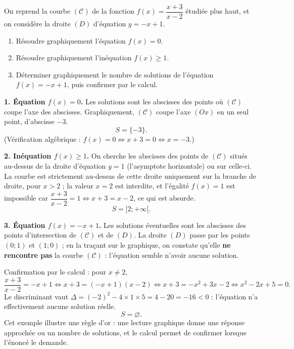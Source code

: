 \documentclass[11pt]{article}
\begin{document}
\begin{exoresolu}
On reprend la courbe $(\mathcal{C})$ de la fonction $f(x)=\dfrac{x+3}{x-2}$ étudiée plus haut, et on considère la droite $(D)$ d'équation $y=-x+1$.
\begin{enumerate}
\item Résoudre graphiquement l'équation $f(x)=0$.
\item Résoudre graphiquement l'inéquation $f(x)\geq 1$.
\item Déterminer graphiquement le nombre de solutions de l'équation $f(x)=-x+1$, puis confirmer par le calcul.
\end{enumerate}
\tcblower
\textbf{1. Équation $f(x)=0$.} Les solutions sont les abscisses des points où $(\mathcal{C})$ coupe l'axe des abscisses. Graphiquement, $(\mathcal{C})$ coupe l'axe $(Ox)$ en un seul point, d'abscisse $-3$.
\[\boxed{S=\{-3\}}.\]
(Vérification algébrique : $f(x)=0\iff x+3=0\iff x=-3$.)

\textbf{2. Inéquation $f(x)\geq 1$.} On cherche les abscisses des points de $(\mathcal{C})$ situés au-dessus de la droite d'équation $y=1$ (l'asymptote horizontale) ou sur celle-ci. La courbe est strictement au-dessus de cette droite uniquement sur la branche de droite, pour $x>2$ ; la valeur $x=2$ est interdite, et l'égalité $f(x)=1$ est impossible car $\dfrac{x+3}{x-2}=1\iff x+3=x-2$, ce qui est absurde.
\[\boxed{S=]2;+\infty[}.\]

\textbf{3. Équation $f(x)=-x+1$.} Les solutions éventuelles sont les abscisses des points d'intersection de $(\mathcal{C})$ et de $(D)$. La droite $(D)$ passe par les points $(0;1)$ et $(1;0)$ ; en la traçant sur le graphique, on constate qu'elle \textbf{ne rencontre pas} la courbe $(\mathcal{C})$ : l'équation semble n'avoir aucune solution.

Confirmation par le calcul : pour $x\neq 2$,
\[\dfrac{x+3}{x-2}=-x+1\iff x+3=(-x+1)(x-2)\iff x+3=-x^2+3x-2\iff x^2-2x+5=0.\]
Le discriminant vaut $\Delta=(-2)^2-4\times 1\times 5=4-20=-16<0$ : l'équation n'a effectivement aucune solution réelle.
\[\boxed{S=\varnothing}.\]
Cet exemple illustre une règle d'or : une lecture graphique donne une réponse approchée ou un nombre de solutions, et le calcul permet de confirmer lorsque l'énoncé le demande.
\end{exoresolu}
\end{document}
